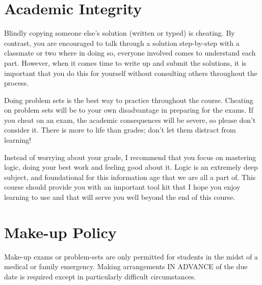 \documentclass[letterpaper]{infinity_syllabus} %
\begin{document}

\newpage %

\makeSide %


\vspace{0.5cm}
\section{Academic Integrity}

Blindly copying someone else’s solution (written or typed) is cheating.
By contrast, you are encouraged to talk through a solution step-by-step with a classmate or two where in doing so, everyone involved comes to understand each part.
However, when it comes time to write up and submit the solutions, it is important that you do this for yourself without consulting others throughout the process.

Doing problem sets is the best way to practice throughout the course.
Cheating on problem sets will be to your own disadvantage in preparing for the exams.
If you cheat on an exam, the academic consequences will be severe, so please don't consider it.
There is more to life than grades; don't let them distract from learning!

Instead of worrying about your grade, I recommend that you focus on mastering logic, doing your best work and feeling good about it.
Logic is an extremely deep subject, and foundational for this information age that we are all a part of.
This course should provide you with an important tool kit that I hope you enjoy learning to use and that will serve you well beyond the end of this course.

\vspace{0.5cm}
\section{Make-up Policy}

Make-up exams or problem-sets are only permitted for students in the midst of a medical or family emergency.
Making arrangements IN ADVANCE of the due date is required except in particularly difficult circumstances.

\vspace{0.5cm}
\end{document}
